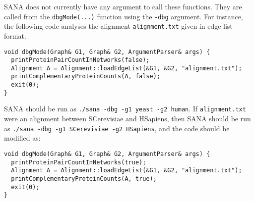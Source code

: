 \documentclass[]{article}
\begin{document}
SANA does not currently have any argument to call these functions. They are called from the \texttt{dbgMode(...)} function using the \texttt{-dbg} argument. For instance, the following code analyses the alignment \texttt{alignment.txt} given in edge-list format.
\begin{verbatim}
void dbgMode(Graph& G1, Graph& G2, ArgumentParser& args) {
  printProteinPairCountInNetworks(false);
  Alignment A = Alignment::loadEdgeList(&G1, &G2, "alignment.txt");
  printComplementaryProteinCounts(A, false);
  exit(0);
}
\end{verbatim}
SANA should be run as \texttt{./sana -dbg -g1 yeast -g2 human}. If \texttt{alignment.txt} were an alignment between SCerevisiae and HSapiens, then SANA should be run as \texttt{./sana -dbg -g1 SCerevisiae -g2 HSapiens}, and the code should be modified as:
\begin{verbatim}
void dbgMode(Graph& G1, Graph& G2, ArgumentParser& args) {
  printProteinPairCountInNetworks(true);
  Alignment A = Alignment::loadEdgeList(&G1, &G2, "alignment.txt");
  printComplementaryProteinCounts(A, true);
  exit(0);
}
\end{verbatim}
\end{document}
